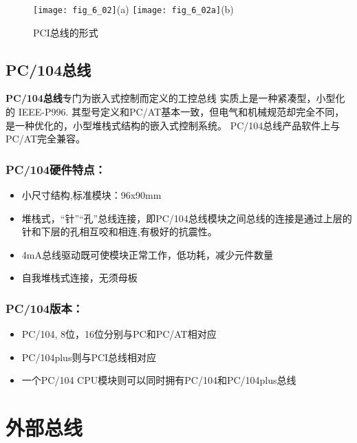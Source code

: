 \begin{figure}
  \centering
  \texttt{[image: fig\_6\_02]}(a)
  \texttt{[image: fig\_6\_02a]}(b)\\
  \caption{PCI总线的形式}\label{fig_6_02}
\end{figure}


\subsection{PC/104总线}


\textbf{PC/104总线}专门为嵌入式控制而定义的工控总线
实质上是一种紧凑型，小型化的 IEEE-P996. 其型号定义和PC/AT基本一致，但电气和机械规范却完全不同，是一种优化的，小型堆栈式结构的嵌入式控制系统。
PC/104总线产品软件上与PC/AT完全兼容。

\subsubsection{PC/104硬件特点：}

\begin{itemize}
  \item 小尺寸结构,标准模块：96x90mm

  \item 堆栈式，“针”“孔”总线连接，即PC/104总线模块之间总线的连接是通过上层的针和下层的孔相互咬和相连,有极好的抗震性。

  \item 4mA总线驱动既可使模块正常工作，低功耗，减少元件数量

  \item 自我堆栈式连接，无须母板

\end{itemize}

\subsubsection{PC/104版本：}
\begin{itemize}
  \item PC/104, 8位，16位分别与PC和PC/AT相对应

  \item PC/104plus则与PCI总线相对应

  \item 一个PC/104 CPU模块则可以同时拥有PC/104和PC/104plus总线

\end{itemize}


\section{外部总线}


